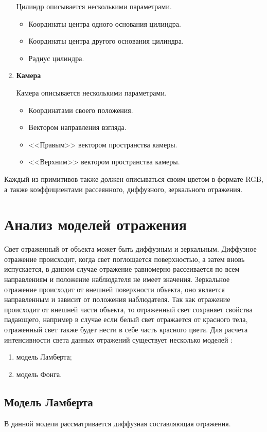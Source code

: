 \begin{enumerate}
	Цилиндр описывается несколькими параметрами.
	\begin{itemize}
		\item Координаты центра одного основания цилиндра.
		\item Координаты центра другого основания цилиндра.
		\item Радиус цилиндра.
	\end{itemize}

	
	\item \textbf{Камера}
	
	Камера описывается несколькими параметрами.
	\begin{itemize}
		\item Координатами своего положения.
		\item Вектором направления взгляда.
		\item <<Правым>> вектором пространства камеры.
		\item <<Верхним>> вектором пространства камеры.
	\end{itemize}
\end{enumerate}

Каждый из примитивов также должен описываться своим цветом в формате RGB, а также
	коэффициентами рассеянного, диффузного, зеркального отражения.
	

\section{Анализ моделей отражения}
\label{sec:reflection_models}
Свет отраженный от объекта может быть диффузным и зеркальным.
Диффузное отражение происходит, когда свет поглощается поверхностью, а затем вновь испускается, в данном случае
отражение равномерно рассеивается по всем направлениям и положение наблюдателя не имеет значения. Зеркальное отражение
происходит от внешней поверхности объекта, оно является направленным и зависит от положения наблюдателя.
Так как отражение происходит от внешней части объекта, то отраженный свет сохраняет свойства падающего, например в случае если белый свет отражается
от красного тела, отраженный свет также будет нести в себе часть красного цвета.
Для расчета интенсивности света данных отражений существует несколько моделей \cite{Rodgers}:
\begin{enumerate}
	\item модель Ламберта;
	\item модель Фонга.
\end{enumerate}

\subsection{Модель Ламберта}
В данной модели рассматривается диффузная составляющая отражения.


